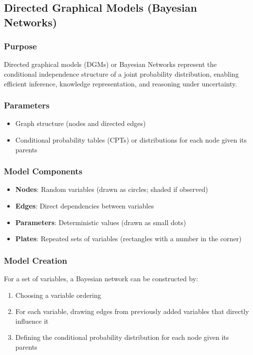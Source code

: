 \documentclass{article}
\begin{document}
\subsection{Directed Graphical Models (Bayesian Networks)}

\subsubsection{Purpose}
Directed graphical models (DGMs) or Bayesian Networks represent the conditional independence structure of a joint probability distribution, enabling efficient inference, knowledge representation, and reasoning under uncertainty.

\subsubsection{Parameters}
\begin{itemize}
    \item Graph structure (nodes and directed edges)
    \item Conditional probability tables (CPTs) or distributions for each node given its parents
\end{itemize}

\subsubsection{Model Components}
\begin{itemize}
    \item \textbf{Nodes}: Random variables (drawn as circles; shaded if observed)
    \item \textbf{Edges}: Direct dependencies between variables
    \item \textbf{Parameters}: Deterministic values (drawn as small dots)
    \item \textbf{Plates}: Repeated sets of variables (rectangles with a number in the corner)
\end{itemize}

\subsubsection{Model Creation}
For a set of variables, a Bayesian network can be constructed by:
\begin{enumerate}
    \item Choosing a variable ordering
    \item For each variable, drawing edges from previously added variables that directly influence it
    \item Defining the conditional probability distribution for each node given its parents
\end{enumerate}
\end{document}
